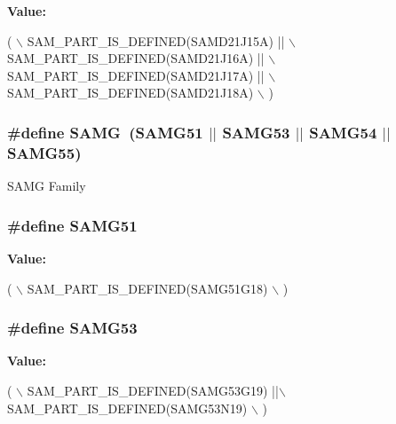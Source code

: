 {\bfseries Value\-:}
\begin{DoxyCode}
( \(\backslash\)
                SAM\_PART\_IS\_DEFINED(SAMD21J15A) || \(\backslash\)
                SAM\_PART\_IS\_DEFINED(SAMD21J16A) || \(\backslash\)
                SAM\_PART\_IS\_DEFINED(SAMD21J17A) || \(\backslash\)
                SAM\_PART\_IS\_DEFINED(SAMD21J18A) \(\backslash\)
        )
\end{DoxyCode}
\hypertarget{group__sam__part__macros__group_gad4ae7782abc1e1087067d9958af3381c}{
\subsubsection[{S\-A\-M\-G}]{\setlength{\rightskip}{0pt plus 5cm}\#define S\-A\-M\-G~(S\-A\-M\-G51 $|$$|$ S\-A\-M\-G53 $|$$|$ S\-A\-M\-G54 $|$$|$ S\-A\-M\-G55)}}\label{group__sam__part__macros__group_gad4ae7782abc1e1087067d9958af3381c}
S\-A\-M\-G Family \hypertarget{group__sam__part__macros__group_gacd7261d3389d2f5c745e64ffe1b89d99}{
\subsubsection[{S\-A\-M\-G51}]{\setlength{\rightskip}{0pt plus 5cm}\#define S\-A\-M\-G51}}\label{group__sam__part__macros__group_gacd7261d3389d2f5c745e64ffe1b89d99}
{\bfseries Value\-:}
\begin{DoxyCode}
( \(\backslash\)
                SAM\_PART\_IS\_DEFINED(SAMG51G18) \(\backslash\)
                )
\end{DoxyCode}
\hypertarget{group__sam__part__macros__group_gaee5167c2eae38c830d175d48769391d8}{
\subsubsection[{S\-A\-M\-G53}]{\setlength{\rightskip}{0pt plus 5cm}\#define S\-A\-M\-G53}}\label{group__sam__part__macros__group_gaee5167c2eae38c830d175d48769391d8}
{\bfseries Value\-:}
\begin{DoxyCode}
( \(\backslash\)
                SAM\_PART\_IS\_DEFINED(SAMG53G19) ||\(\backslash\)
                SAM\_PART\_IS\_DEFINED(SAMG53N19) \(\backslash\)
                )
\end{DoxyCode}
